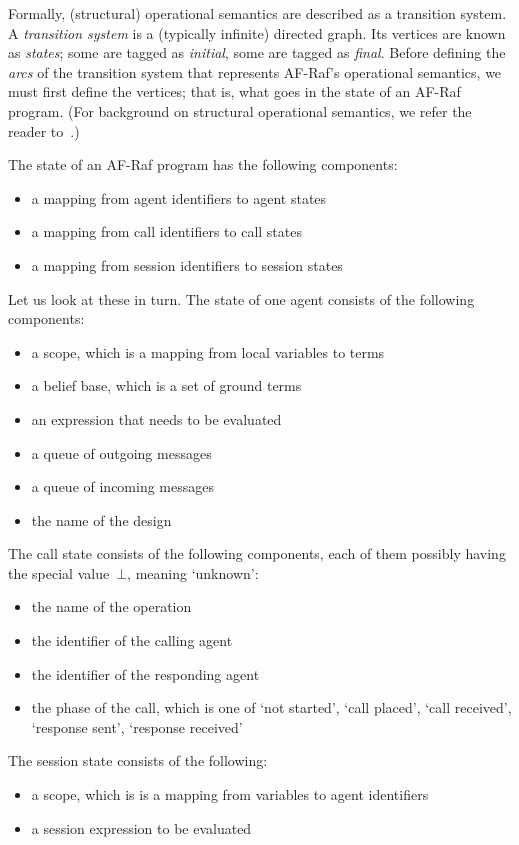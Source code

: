 \documentclass[a4paper,12pt,oneside,fleqn]{book} %
\begin{document}
Formally, (structural) operational semantics are described as a transition
system. A \emph{transition system} is a (typically infinite) directed
graph. Its vertices are known as \emph{states}; some are tagged as
\emph{initial}, some are tagged as \emph{final}. Before defining the
\emph{arcs} of the transition system that represents AF-Raf's operational
semantics, we must first define the vertices; that is, what goes in the
state of an AF-Raf program. (For background on structural operational
semantics, we refer the reader to~\cite[Section~5.2]{harper2012}.)

The state of an AF-Raf program has the following components:
\begin{itemize}
\item a mapping from agent identifiers to agent states
\item a mapping from call identifiers to call states
\item a mapping from session identifiers to session states
\end{itemize}
Let us look at these in turn. The state of one agent consists of the
following components:
\begin{itemize}
\item a scope, which is a mapping from local variables to terms
\item a belief base, which is a set of ground terms
\item an expression that needs to be evaluated
\item a queue of outgoing messages
\item a queue of incoming messages
\item the name of the design
\end{itemize}
The call state consists of the following components, each of them possibly
having the special value~$\bot$, meaning `unknown':
\begin{itemize}
\item the name of the operation
\item the identifier of the calling agent
\item the identifier of the responding agent
\item the phase of the call, which is one of `not started', `call placed',
`call received', `response sent', `response received'
\end{itemize}
The session state consists of the following:
\begin{itemize}
\item a scope, which is is a mapping from variables to agent identifiers
\item a session expression to be evaluated
\end{itemize}
\end{document}
